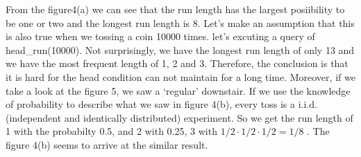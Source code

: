 \documentclass[twoside]{article}
\begin{document}
From the figure4(a) we can see that the run length has the largest posiibility to be one or two and the longest run length is 8. Let's make an assumption that this is also true when we tossing a coin 10000 times. let's excuting a query of head\_run(10000).
Not surprisingly, we have the longest run length of only 13 and we have the most frequent length of 1, 2 and 3. Therefore, the conclusion is that it is hard for the head condition can not maintain for a long time. Moreover, if we take a look at the figure 5, we saw a `regular' downstair. If we use the knowledge of probability to describe what we saw in figure 4(b), every toss is a i.i.d.(independent and identically distributed) experiment. So we get the run length of 1 with the probabilty 0.5, and 2 with 0.25, 3 with $1/2 \cdot 1/2 \cdot 1/2 = 1/8$ . The figure 4(b) seems to arrive at the similar result. 
\clearpage
\newpage
\end{document}
